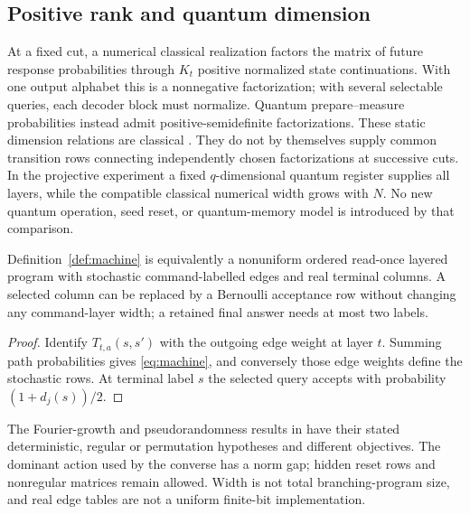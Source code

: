 \subsection{Positive rank and quantum dimension}
At a fixed cut, a numerical classical realization factors the matrix
of future response probabilities through $K_t$ positive normalized
state continuations. With one output alphabet this is a nonnegative
factorization; with several selectable queries, each decoder block
must normalize. Quantum prepare--measure probabilities instead admit
positive-semidefinite factorizations. These static dimension
relations are classical \cite{FMPST}. They do not by themselves
supply common transition rows connecting independently chosen
factorizations at successive cuts. In the projective experiment a
fixed $q$-dimensional quantum register supplies all layers, while the
compatible classical numerical width grows with $N$. No new quantum
operation, seed reset, or quantum-memory model is introduced by that
comparison.

\begin{proposition}\label{prop:program}
Definition~\ref{def:machine} is equivalently a nonuniform ordered
read-once layered program with stochastic command-labelled edges and
real terminal columns. A selected column can be replaced by a
Bernoulli acceptance row without changing any command-layer width;
a retained final answer needs at most two labels.
\end{proposition}
\begin{proof}
Identify $T_{t,a}(s,s')$ with the outgoing edge weight at layer $t$.
Summing path probabilities gives \eqref{eq:machine}, and conversely
those edge weights define the stochastic rows. At terminal label $s$
the selected query accepts with probability $(1+d_j(s))/2$.
\end{proof}
The Fourier-growth and pseudorandomness results in
\cite{RSV,SVW,LPV} have their stated deterministic, regular or
permutation hypotheses and different objectives. The dominant action used by the converse
has a norm gap; hidden reset rows and nonregular matrices remain
allowed. Width is not total branching-program size, and real edge
tables are not a uniform finite-bit implementation.

